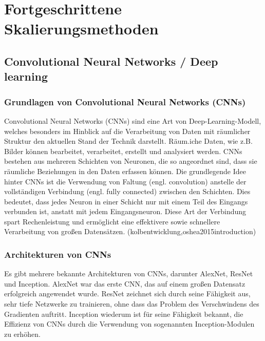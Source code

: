 


\chapter{Fortgeschrittene Skalierungsmethoden}
\section{Convolutional Neural Networks / Deep learning}
    \subsection{Grundlagen von Convolutional Neural Networks (CNNs)}
        Convolutional Neural Networks (CNNs) sind eine Art von Deep-Learning-Modell, welches besonders im Hinblick auf die Verarbeitung von Daten mit räumlicher Struktur den aktuellen Stand der Technik darstellt.      
        Räum.iche Daten, wie z.B.      Bilder können bearbeitet, verarbeitet, erstellt und analysiert werden.      
        CNNs bestehen aus mehreren Schichten von Neuronen, die so angeordnet sind, dass sie räumliche Beziehungen in den Daten erfassen können.
        Die grundlegende Idee hinter CNNs ist die Verwendung von Faltung (engl.      convolution) anstelle der vollständigen Verbindung (engl.      fully connected) zwischen den Schichten.      
        Dies bedeutet, dass jedes Neuron in einer Schicht nur mit einem Teil des Eingangs verbunden ist, anstatt mit jedem Eingangsneuron.      
        Diese Art der Verbindung spart Rechenleistung und ermöglicht eine effektivere sowie schnellere Verarbeitung von großen Datensätzen.
        \footfullcite(kolbentwicklung,oshea2015introduction)
    \subsection{Architekturen von CNNs}
    
        Es gibt mehrere bekannte Architekturen von CNNs, darunter AlexNet, ResNet und Inception.      
        AlexNet war das erste CNN, das auf einem großen Datensatz erfolgreich angewendet wurde.      
        ResNet zeichnet sich durch seine Fähigkeit aus, sehr tiefe Netzwerke zu trainieren, ohne dass das Problem des Verschwindens des Gradienten auftritt.      
        Inception wiederum ist für seine Fähigkeit bekannt, die Effizienz von CNNs durch die Verwendung von sogenannten Inception-Modulen zu erhöhen.

